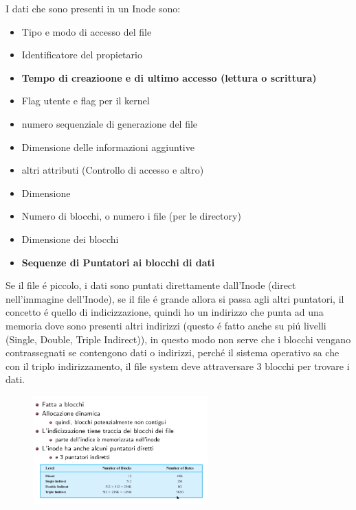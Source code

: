 I dati che sono presenti in un Inode sono:
\begin{itemize}
    \item Tipo e modo di accesso del file
    \item Identificatore del propietario
    \item \textbf{Tempo di creazioone e di ultimo accesso (lettura o scrittura)}
    \item Flag utente e flag per il kernel
    \item numero sequenziale di generazione del file
    \item Dimensione delle informazioni aggiuntive
    \item altri attributi (Controllo di accesso e altro)
    \item Dimensione
    \item Numero di blocchi, o numero i file (per le directory)
    \item Dimensione dei blocchi
    \item \textbf{Sequenze di Puntatori ai blocchi di dati}
\end{itemize}
Se il file é piccolo, i dati sono puntati direttamente dall'Inode (direct nell'immagine dell'Inode), se il file é grande
allora si passa agli altri puntatori, il concetto é quello di indicizzazione, quindi ho un indirizzo che punta ad una memoria
dove sono presenti altri indirizzi (questo é fatto anche su piú livelli (Single, Double, Triple Indirect)), in questo modo
non serve che i blocchi vengano contrassegnati se contengono dati o indirizzi, perché il sistema operativo sa che con il triplo
indirizzamento, il file system deve attraversare 3 blocchi per trovare i dati.
\begin{figure}[H]
    \centering
    \includegraphics[width=0.6\textwidth]{immagini/Inode2}
\end{figure}
